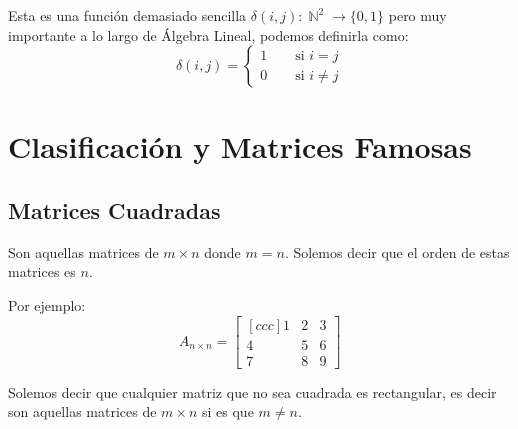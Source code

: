 \documentclass[12pt, fleqn]{report}                             %
\DeclareMathOperator \Space {\quad}                             %
\theoremstyle{break}                                            %
\DeclareMathOperator \Naturals     {\mathbb{N}}                 %
\begin{document}
            Esta es una función demasiado sencilla $\delta(i,j): \Naturals^2 \to \{0,1\}$
            pero muy importante a lo largo de Álgebra Lineal, podemos definirla como:
            \begin{equation*}
                \delta(i,j) =
                \begin{cases}
                    1 \Space \text{ si } i = j      \\
                    0 \Space \text{ si } i \neq j
                \end{cases}
            \end{equation*}



        \clearpage
        \section{Clasificación y Matrices Famosas}

            \subsection{Matrices Cuadradas}

                Son aquellas matrices de $m \times n$ donde $m = n$.
                Solemos decir que el orden de estas matrices es $n$.

                Por ejemplo: 
                \begin{equation*}
                    A_{n \times n} =
                    \begin{bmatrix}[ccc]
                        1 & 2 & 3 \\
                        4 & 5 & 6 \\
                        7 & 8 & 9
                    \end{bmatrix}
                \end{equation*}

                Solemos decir que cualquier matriz que no sea cuadrada es
                rectangular, es decir son aquellas matrices de $m \times n$
                si es que $m \neq n$.
\end{document}
